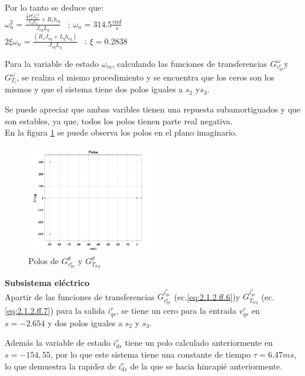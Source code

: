 \documentclass[10pt]{article}
\begin{document}
\begin{itemize}
Por lo tanto se deduce que:\\
$\omega_{n}^2 =\frac{\frac{ \frac{3}{2}P_{p}^{2}\lambda ^{r'2}_{m}}{J_{eq}L_{q}}+R_{s}b_{eq}}{J_{eq}L_{q}}$ \ ; $\omega_{n}=314.5 \frac{rad}{s}$\\
$2\xi \omega_{n}=\frac{(R_{s}J_{eq}+L_{q}b_{eq})}{J_{eq}L_{q}}$ \ ; $\xi=0.2838$

Para la variable de estado $\omega_{m}$, calculando las funciones de transferencias $G^{\omega}_{v^{r}_{qs}}$y $G^{\omega}_{T_{l}}$, se realiza el mismo procedimiento y se encuentra que los ceros son los mismos y que el sistema tiene dos polos iguales a $s_{2}$ y$s_{3}$.

Se puede apreciar que ambas varibles tienen una repuesta subamortiguados y que son estables, ya que, todos los polos tienen parte real negativa.\\
En la figura \ref{fig:polos} se puede observa los polos en el plano imaginario.

	\begin{figure}[h!]
	\centering
	\includegraphics[width=0.5\textwidth]{polos.png}
	\caption{\label{fig:polos}  Polos de $G^{\theta}_{v^{r}_{qs}}$ y $G^{\theta}_{T_{leq}}$}
	\end{figure}

\subitem \textbf{Subsistema eléctrico}\\
Apartir de las funciones de transferencias $G^{i^{r}_{qs}}_{v^{r}_{qs}}$ (ec.\ref{eq:2.1.2.ff.6})y $G^{i^{r}_{qs}}_{T_{leq}}$ (ec.\ref{eq:2.1.2.ff.7}) para la salida $i^{r}_{qs}$, se tiene un cero para la entrada $v^{r}_{qs}$ en $s=-2.654$ y dos polos iguales a $s_{2}$ y $s_{3}$.

Además la variable de estado $i^{r}_{ds}$ tiene un polo calculado anteriormente en $s=-154,55$, por lo que este sistema tiene una constante de tiempo $\tau=6.47 ms$, lo que demuestra la rapidez de $i^{r}_{ds}$ de la que se hacia hincapié anteriormente.


\end{itemize}
\end{document}
